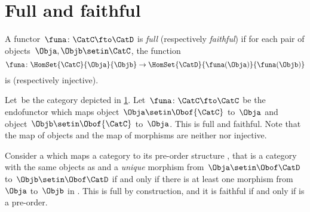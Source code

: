 
\section{Full and faithful }

\begin{ctdefinition}
    \label{def:functorfullfaith}
    A functor~$\funa\colon \CatC \fto \CatD$ is \emph{full} (respectively \emph{faithful}) if for each pair of objects~$\Obja,\Objb\setin \CatC$, the function
    \begin{equation}
        \funa \colon \HomSet{\CatC}{\Obja}{\Objb} \to \HomSet{\CatD}{\funa(\Obja)}{\funa(\Objb)}
    \end{equation}
    is  (respectively injective).
\end{ctdefinition}

\begin{example}
    Let~\CatC be the category depicted in \cref{fig:ex_full_faithful_1}.
    Let~$\funa\colon \CatC \fto \CatC$ be the endofunctor which maps object~$\Obja\setin \Obof{\CatC}$ to~$\Obja$ and object~$\Objb\setin \Obof{\CatC}$ to~$\Obja$.
    This  is full and faithful.
    Note that the map of objects and the map of morphisms are neither  nor injective.

    \begin{figure}[h!]
        \centering
        \caption{}
        \label{fig:ex_full_faithful_1}
    \end{figure}
\end{example}

\begin{example}
    Consider a  which maps a category \CatC to its pre-order structure \CatD, that is a category with the same objects as \CatC and a \emph{unique} morphism from~$\Obja\setin \Obof\CatD$ to~$\Objb\setin \Obof\CatD$ if and only if there is at least one morphism from~$\Obja$ to~$\Objb$ in \CatC.
    This  is full by construction, and it is faithful if and only if \CatC is a pre-order.
\end{example}

